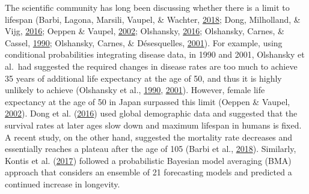 \documentclass[12pt,twoside]{unicam}
\begin{document}
The scientific community has long been discussing whether there is a limit to lifespan (Barbi, Lagona, Marsili, Vaupel, \& Wachter, \protect\hyperlink{ref-Barbi2018}{2018}; Dong, Milholland, \& Vijg, \protect\hyperlink{ref-Dong2016}{2016}; Oeppen \& Vaupel, \protect\hyperlink{ref-Oeppen2002}{2002}; Olshansky, \protect\hyperlink{ref-Olshansky2016}{2016}; Olshansky, Carnes, \& Cassel, \protect\hyperlink{ref-Olshansky1990}{1990}; Olshansky, Carnes, \& Désesquelles, \protect\hyperlink{ref-Olshansky2001}{2001}). For example, using conditional probabilities integrating disease data, in 1990 and 2001, Olshansky et al.~had suggested the required changes in disease rates are too much to achieve 35 years of additional life expectancy at the age of 50, and thus it is highly unlikely to achieve (Olshansky et al., \protect\hyperlink{ref-Olshansky1990}{1990}, \protect\hyperlink{ref-Olshansky2001}{2001}). However, female life expectancy at the age of 50 in Japan surpassed this limit (Oeppen \& Vaupel, \protect\hyperlink{ref-Oeppen2002}{2002}). Dong et al. (\protect\hyperlink{ref-Dong2016}{2016}) used global demographic data and suggested that the survival rates at later ages slow down and maximum lifespan in humans is fixed. A recent study, on the other hand, suggested the mortality rate decreases and essentially reaches a plateau after the age of 105 (Barbi et al., \protect\hyperlink{ref-Barbi2018}{2018}). Similarly, Kontis et al. (\protect\hyperlink{ref-Kontis2017}{2017}) followed a probabilistic Bayesian model averaging (BMA) approach that considers an ensemble of 21 forecasting models and predicted a continued increase in longevity.
\end{document}
